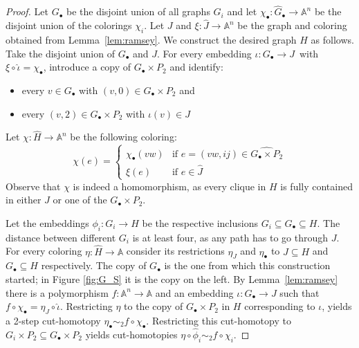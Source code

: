 \documentclass[oneside]{amsart}
\newcommand{\str}[1]{\mathbb{#1}}
\begin{document}
\begin{proof}
Let $G_\bullet$ be the disjoint union of all graphs $G_i$ and let $\chi_\bullet\colon \hat G_\bullet\to\str A^n$ be the disjoint union of the colorings $\chi_i$. Let $J$ and $\xi\colon \hat J\to\str A^n$ be the graph and coloring obtained from Lemma~\ref{lem:ramsey}. We construct the desired graph $H$ as follows. Take the disjoint union of $G_\bullet$ and $J$. For every embedding $\iota\colon G_\bullet\to J$\ with $\xi\circ\hat\iota=\chi_\bullet$, introduce a copy of $G_\bullet \times P_2$ and identify:
\begin{itemize}
    \item every $v\in G_\bullet$ with $(v,0)\in G_\bullet\times P_2$ and
    \item every $(v,2)\in G_\bullet\times P_2$ with $\iota(v)\in J$
\end{itemize} 
Let $\chi\colon\hat H\to\str A^n$ be the following coloring:
$$
\chi(e) = 
\begin{cases}
    \chi_\bullet(vw) &\text{if } e = (vw,ij)\in\widehat{G_\bullet\times P_2}\\ 
    \xi(e) &\text{if } e\in \hat J
\end{cases}
$$
Observe that $\chi$ is indeed a homomorphism, as every clique in $H$ is fully contained in either $J$ or one of the $G_\bullet\times P_2$.

Let the embeddings $\phi_i\colon G_i\to H$ be the respective inclusions $G_i\subseteq G_\bullet\subseteq H$. The distance between different $G_i$ is at least four, as any path has to go through $J$. For every coloring $\eta\colon \hat H\to\str A$ consider its restrictions $\eta_J$  and $\eta_\bullet$ to $J\subseteq H$ and $G_\bullet\subseteq H$ respectively. The copy of $G_{\bullet}$ is the one from which this construction started; in Figure \ref{fig:G_S} it is the copy on the left.
By Lemma~\ref{lem:ramsey} there is a polymorphism $f\colon\str A^n\to \str A$ and an embedding $\iota\colon G_\bullet\to J$ such that $f\circ\chi_\bullet = \eta_J\circ \hat\iota$. Restricting $\eta$ to the copy of $G_\bullet\times P_2$ in $H$ corresponding to $\iota$, yields a 2-step cut-homotopy $\eta_\bullet\sim_2 f\circ\chi_\bullet$. Restricting this cut-homotopy to $G_i\times P_2\subseteq G_\bullet\times P_2$ yields cut-homotopies
$
\eta\circ \hat \phi_i\sim_2 f\circ\chi_i 
$.

\end{proof}
\end{document}
